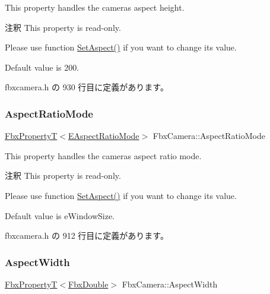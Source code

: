This property handles the camera\textquotesingle{}s aspect height.

\begin{DoxyRemark}{注釈}
This property is read-\/only. 

Please use function \hyperlink{class_fbx_camera_adb9cf67e4b59463add6a052003797392}{Set\+Aspect()} if you want to change its value.
\end{DoxyRemark}
Default value is 200. 

 fbxcamera.\+h の 930 行目に定義があります。

\mbox{\label{class_fbx_camera_ad140535acab4a663a6f4cb51ef603e7a}} 
\subsubsection{\texorpdfstring{Aspect\+Ratio\+Mode}{AspectRatioMode}}
{\footnotesize\ttfamily \hyperlink{class_fbx_property_t}{Fbx\+PropertyT}$<$\hyperlink{class_fbx_camera_a2135478bb5fd6985835c14b11e1fccda}{E\+Aspect\+Ratio\+Mode}$>$ Fbx\+Camera\+::\+Aspect\+Ratio\+Mode}

This property handles the camera\textquotesingle{}s aspect ratio mode.

\begin{DoxyRemark}{注釈}
This property is read-\/only. 

Please use function \hyperlink{class_fbx_camera_adb9cf67e4b59463add6a052003797392}{Set\+Aspect()} if you want to change its value.
\end{DoxyRemark}
Default value is e\+Window\+Size. 

 fbxcamera.\+h の 912 行目に定義があります。

\mbox{\label{class_fbx_camera_ada3746eb834815c224eb5fc223fa35ac}} 
\subsubsection{\texorpdfstring{Aspect\+Width}{AspectWidth}}
{\footnotesize\ttfamily \hyperlink{class_fbx_property_t}{Fbx\+PropertyT}$<$\hyperlink{fbxtypes_8h_a171e72a1c46fc15c1a6c9c31948c1c5b}{Fbx\+Double}$>$ Fbx\+Camera\+::\+Aspect\+Width}

